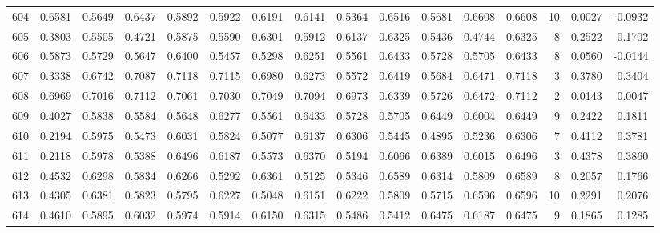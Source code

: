 \begin{tabular}{lrrrrrrrrrrrrrrr}
604 &      0.6581 &  0.5649 &  0.6437 &  0.5892 &  0.5922 &  0.6191 &  0.6141 &  0.5364 &  0.6516 &  0.5681 &   0.6608 &     0.6608 &     10 &                    0.0027 &                    -0.0932 \\
605 &      0.3803 &  0.5505 &  0.4721 &  0.5875 &  0.5590 &  0.6301 &  0.5912 &  0.6137 &  0.6325 &  0.5436 &   0.4744 &     0.6325 &      8 &                    0.2522 &                     0.1702 \\
606 &      0.5873 &  0.5729 &  0.5647 &  0.6400 &  0.5457 &  0.5298 &  0.6251 &  0.5561 &  0.6433 &  0.5728 &   0.5705 &     0.6433 &      8 &                    0.0560 &                    -0.0144 \\
607 &      0.3338 &  0.6742 &  0.7087 &  0.7118 &  0.7115 &  0.6980 &  0.6273 &  0.5572 &  0.6419 &  0.5684 &   0.6471 &     0.7118 &      3 &                    0.3780 &                     0.3404 \\
608 &      0.6969 &  0.7016 &  0.7112 &  0.7061 &  0.7030 &  0.7049 &  0.7094 &  0.6973 &  0.6339 &  0.5726 &   0.6472 &     0.7112 &      2 &                    0.0143 &                     0.0047 \\
609 &      0.4027 &  0.5838 &  0.5584 &  0.5648 &  0.6277 &  0.5561 &  0.6433 &  0.5728 &  0.5705 &  0.6449 &   0.6004 &     0.6449 &      9 &                    0.2422 &                     0.1811 \\
610 &      0.2194 &  0.5975 &  0.5473 &  0.6031 &  0.5824 &  0.5077 &  0.6137 &  0.6306 &  0.5445 &  0.4895 &   0.5236 &     0.6306 &      7 &                    0.4112 &                     0.3781 \\
611 &      0.2118 &  0.5978 &  0.5388 &  0.6496 &  0.6187 &  0.5573 &  0.6370 &  0.5194 &  0.6066 &  0.6389 &   0.6015 &     0.6496 &      3 &                    0.4378 &                     0.3860 \\
612 &      0.4532 &  0.6298 &  0.5834 &  0.6266 &  0.5292 &  0.6361 &  0.5125 &  0.5346 &  0.6589 &  0.6314 &   0.5809 &     0.6589 &      8 &                    0.2057 &                     0.1766 \\
613 &      0.4305 &  0.6381 &  0.5823 &  0.5795 &  0.6227 &  0.5048 &  0.6151 &  0.6222 &  0.5809 &  0.5715 &   0.6596 &     0.6596 &     10 &                    0.2291 &                     0.2076 \\
614 &      0.4610 &  0.5895 &  0.6032 &  0.5974 &  0.5914 &  0.6150 &  0.6315 &  0.5486 &  0.5412 &  0.6475 &   0.6187 &     0.6475 &      9 &                    0.1865 &                     0.1285 \\

\end{tabular}
